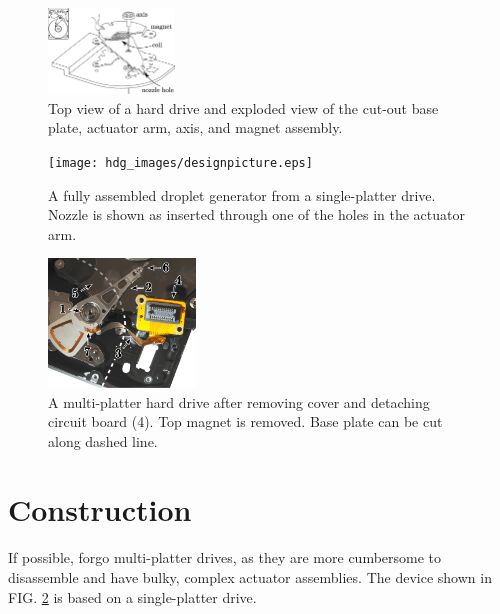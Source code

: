 \documentclass[aip,rsi,reprint,graphicx]{revtex4-1} %
\begin{document}

\begin{figure}
\centering
\includegraphics[width=0.3\textwidth]{hdg_images/dge.eps}
\caption{Top view of a hard drive and exploded view of the cut-out base
plate, actuator arm, axis, and magnet assembly. \label{fig:designschematic}}
\end{figure}
\begin{figure}
\centering
\texttt{[image: hdg\_images/designpicture.eps]}
\caption{A fully assembled droplet generator from a single-platter drive. Nozzle is shown as inserted
through one of the holes in the actuator arm. \label{fig:photo}}
\end{figure}
\begin{figure}
\centering
\includegraphics[width=0.35\textwidth]{hdg_images/numbers.pdf}
\caption{A multi-platter hard drive after removing cover and detaching circuit board (4). Top
        magnet is removed. Base plate can be cut along dashed line. \label{fig:numbers}}
\end{figure}


\section{Construction}
If possible, forgo multi-platter drives, as they are more cumbersome to disassemble and have
bulky, complex actuator assemblies. The device shown in FIG. \ref{fig:photo}
is based on a single-platter drive.
\end{document}
